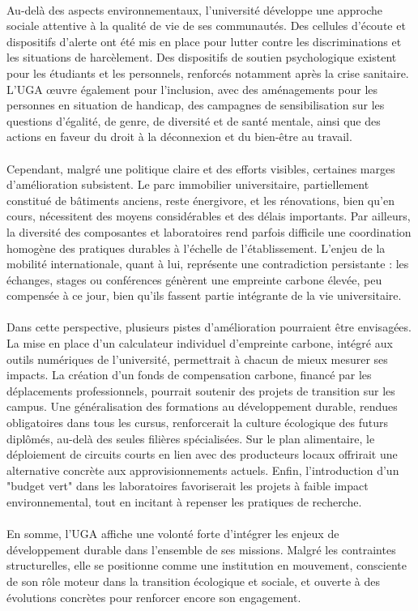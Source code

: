 \documentclass[12pt]{article}
\begin{document}
\\
Au-delà des aspects environnementaux, l’université développe une approche sociale attentive à la qualité de vie de ses communautés. Des cellules d’écoute et dispositifs d’alerte ont été mis en place pour lutter contre les discriminations et les situations de harcèlement. Des dispositifs de soutien psychologique existent pour les étudiants et les personnels, renforcés notamment après la crise sanitaire. L’UGA œuvre également pour l’inclusion, avec des aménagements pour les personnes en situation de handicap, des campagnes de sensibilisation sur les questions d’égalité, de genre, de diversité et de santé mentale, ainsi que des actions en faveur du droit à la déconnexion et du bien-être au travail.\\
\\
Cependant, malgré une politique claire et des efforts visibles, certaines marges d’amélioration subsistent. Le parc immobilier universitaire, partiellement constitué de bâtiments anciens, reste énergivore, et les rénovations, bien qu’en cours, nécessitent des moyens considérables et des délais importants. Par ailleurs, la diversité des composantes et laboratoires rend parfois difficile une coordination homogène des pratiques durables à l’échelle de l’établissement. L’enjeu de la mobilité internationale, quant à lui, représente une contradiction persistante : les échanges, stages ou conférences génèrent une empreinte carbone élevée, peu compensée à ce jour, bien qu’ils fassent partie intégrante de la vie universitaire.\\
\\
Dans cette perspective, plusieurs pistes d’amélioration pourraient être envisagées. La mise en place d’un calculateur individuel d’empreinte carbone, intégré aux outils numériques de l’université, permettrait à chacun de mieux mesurer ses impacts. La création d’un fonds de compensation carbone, financé par les déplacements professionnels, pourrait soutenir des projets de transition sur les campus. Une généralisation des formations au développement durable, rendues obligatoires dans tous les cursus, renforcerait la culture écologique des futurs diplômés, au-delà des seules filières spécialisées. Sur le plan alimentaire, le déploiement de circuits courts en lien avec des producteurs locaux offrirait une alternative concrète aux approvisionnements actuels. Enfin, l’introduction d’un "budget vert" dans les laboratoires favoriserait les projets à faible impact environnemental, tout en incitant à repenser les pratiques de recherche.\\
\\
En somme, l’UGA affiche une volonté forte d’intégrer les enjeux de développement durable dans l’ensemble de ses missions. Malgré les contraintes structurelles, elle se positionne comme une institution en mouvement, consciente de son rôle moteur dans la transition écologique et sociale, et ouverte à des évolutions concrètes pour renforcer encore son engagement.
\end{document}

